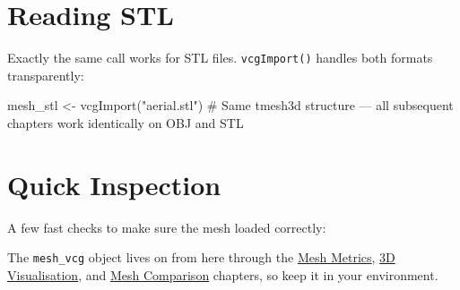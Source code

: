 \documentclass[
  11pt,
  letterpaper,
  DIV=11,
  numbers=noendperiod]{scrreprt}
\newenvironment{Shaded}{\begin{snugshade}}{\end{snugshade}}
\newcommand{\CommentTok}[1]{\textcolor[rgb]{0.37,0.37,0.37}{#1}}
\newcommand{\DecValTok}[1]{\textcolor[rgb]{0.68,0.00,0.00}{#1}}
\newcommand{\FunctionTok}[1]{\textcolor[rgb]{0.28,0.35,0.67}{#1}}
\newcommand{\NormalTok}[1]{\textcolor[rgb]{0.00,0.23,0.31}{#1}}
\newcommand{\OtherTok}[1]{\textcolor[rgb]{0.00,0.23,0.31}{#1}}
\newcommand{\SpecialCharTok}[1]{\textcolor[rgb]{0.37,0.37,0.37}{#1}}
\newcommand{\StringTok}[1]{\textcolor[rgb]{0.13,0.47,0.30}{#1}}
\begin{document}
\section{Reading STL}\label{reading-stl}

Exactly the same call works for STL files. \texttt{vcgImport()} handles
both formats transparently:

\begin{Shaded}
\begin{Highlighting}[]
\NormalTok{mesh\_stl }\OtherTok{\textless{}{-}} \FunctionTok{vcgImport}\NormalTok{(}\StringTok{"aerial.stl"}\NormalTok{)}
\CommentTok{\# Same tmesh3d structure — all subsequent chapters work identically on OBJ and STL}
\end{Highlighting}
\end{Shaded}

\section{Quick Inspection}\label{quick-inspection}

A few fast checks to make sure the mesh loaded correctly:

\begin{Shaded}
\end{Shaded}

The \texttt{mesh\_vcg} object lives on from here through the
\href{mesh-metrics.qmd}{Mesh Metrics}, \href{mesh-visualisation.qmd}{3D
Visualisation}, and \href{mesh-comparison.qmd}{Mesh Comparison}
chapters, so keep it in your environment.
\end{document}
